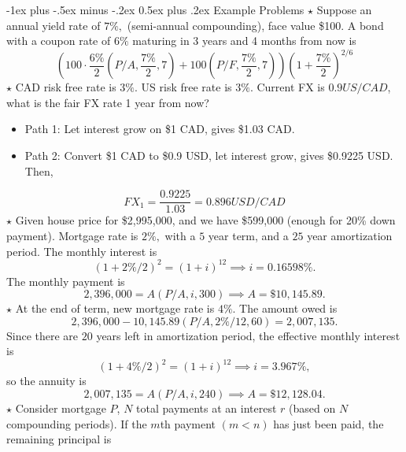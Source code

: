 \documentclass[11pt,landscape]{article}
\makeatletter
\renewcommand{\section}{\@startsection{section}{1}{0mm}%
                                {-1ex plus -.5ex minus -.2ex}%
                                {0.5ex plus .2ex}%
                                {\normalfont\large\bfseries}}
\makeatother
\begin{document}
\begin{multicols*}{3}
\section{Example Problems}
$\star$ Suppose an annual yield rate of $7\%,$ (semi-annual compounding), face value \$100. A bond with a coupon rate of $6\%$ maturing in 3 years and 4 months from now is 
\begin{equation*}
    \left(100\cdot \frac{6\%}{2}(P/A,\frac{7\%}{2},7) + 100(P/F,\frac{7\%}{2},7)\right)\left(1+\frac{7\%}{2}\right)^{2/6}
\end{equation*}
$\star$ CAD risk free rate is $3\%.$ US risk free rate is $3\%.$ Current FX is $0.9 US/CAD$, what is the fair FX rate 1 year from now? 
\begin{itemize}
    \item Path 1: Let interest grow on \$1 CAD, gives \$1.03 CAD.
    \item Path 2: Convert \$1 CAD to \$0.9 USD, let interest grow, gives \$0.9225 USD. Then,
\end{itemize}
\begin{equation*}
    FX_1 = \frac{0.9225}{1.03} = 0.896 USD/CAD
\end{equation*}
$\star$ Given house price for \$2,995,000, and we have \$599,000 (enough for 20\% down payment). Mortgage rate is $2\%,$ with a $5$ year term, and a $25$ year amortization period. The monthly interest is 
\begin{equation*}
    (1+2\%/2)^2 = (1+i)^{12} \implies i = 0.16598\%.
\end{equation*} 
The monthly payment is
\begin{equation*}
    2,396,000 = A(P/A,i,300) \implies A = \$10,145.89.
\end{equation*}
$\star$ At the end of term, new mortgage rate is $4\%.$ The amount owed is 
\begin{equation*}
    2,396,000 - 10,145.89(P/A,2\%/12,60) = 2,007,135.
\end{equation*}
Since there are $20$ years left in amortization period, the effective monthly interest is 
\begin{equation*}
    (1+4\%/2)^2 = (1+i)^{12} \implies i =3.967\%,
\end{equation*}
so the annuity is 
\begin{equation*}
    2,007,135 = A(P/A,i,240) \implies A = \$12,128.04.
\end{equation*}
$\star$ Consider mortgage $P$, $N$ total payments at an interest $r$ (based on $N$ compounding periods). If the $m$th payment $(m<n)$ has just been paid, the remaining principal is

\end{multicols*}
\end{document}
